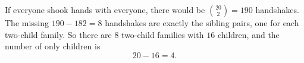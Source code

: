 If everyone shook hands with everyone, there would be $\binom{20}{2}=190$ handshakes. The missing $190-182=8$ handshakes are exactly the sibling pairs, one for each two-child family. So there are $8$ two-child families with $16$ children, and the number of only children is
\[
20-16=\boxed{4}.
\]
